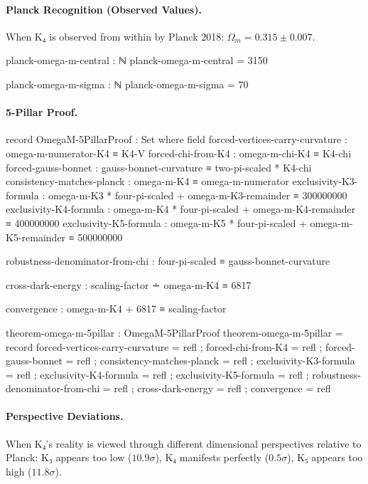 \documentclass[11pt,a4paper]{book}
\begin{document}
\paragraph{Planck Recognition (Observed Values).}
When K₄ is observed from within by Planck 2018: $\Omega_m = 0.315 \pm 0.007$.

\begin{code}
planck-omega-m-central : ℕ
planck-omega-m-central = 3150

planck-omega-m-sigma : ℕ
planck-omega-m-sigma = 70

\end{code}

\paragraph{5-Pillar Proof.}

\begin{code}
record OmegaM-5PillarProof : Set where
  field
    forced-vertices-carry-curvature : omega-m-numerator-K4 ≡ K4-V
    forced-chi-from-K4 : omega-m-chi-K4 ≡ K4-chi
    forced-gauss-bonnet : gauss-bonnet-curvature ≡ two-pi-scaled * K4-chi
    consistency-matches-planck : omega-m-K4 ≡ omega-m-numerator
    exclusivity-K3-formula : omega-m-K3 * four-pi-scaled + omega-m-K3-remainder ≡ 300000000
    exclusivity-K4-formula : omega-m-K4 * four-pi-scaled + omega-m-K4-remainder ≡ 400000000
    exclusivity-K5-formula : omega-m-K5 * four-pi-scaled + omega-m-K5-remainder ≡ 500000000
    
    robustness-denominator-from-chi : four-pi-scaled ≡ gauss-bonnet-curvature
    
    cross-dark-energy : scaling-factor ∸ omega-m-K4 ≡ 6817
    
    convergence : omega-m-K4 + 6817 ≡ scaling-factor

theorem-omega-m-5pillar : OmegaM-5PillarProof
theorem-omega-m-5pillar = record
  { forced-vertices-carry-curvature = refl
  ; forced-chi-from-K4 = refl
  ; forced-gauss-bonnet = refl
  ; consistency-matches-planck = refl
  ; exclusivity-K3-formula = refl
  ; exclusivity-K4-formula = refl
  ; exclusivity-K5-formula = refl
  ; robustness-denominator-from-chi = refl
  ; cross-dark-energy = refl
  ; convergence = refl
  }

\end{code}

\paragraph{Perspective Deviations.}
When K₄'s reality is viewed through different dimensional perspectives relative to Planck:
K₃ appears too low ($10.9\sigma$), K₄ manifests perfectly ($0.5\sigma$), K₅ appears too high ($11.8\sigma$).
\end{document}
